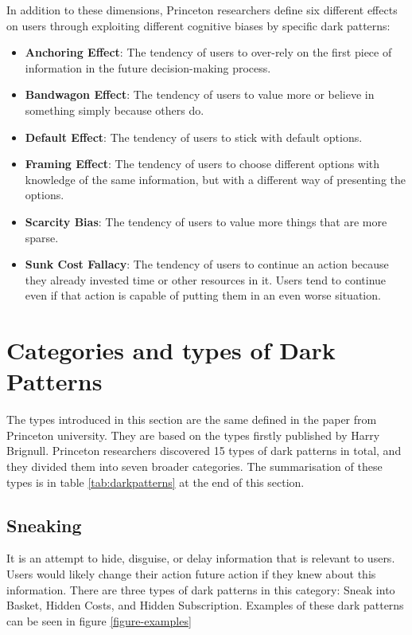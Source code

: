 In addition to these dimensions, Princeton researchers define six different effects on users through exploiting different cognitive biases by specific dark patterns:

\begin{itemize}
    \item \textbf{Anchoring Effect}: The tendency of users to over-rely on the first piece of information in the future decision-making process.
    \item \textbf{Bandwagon Effect}: The tendency of users to value more or believe in something simply because others do.
    \item \textbf{Default Effect}: The tendency of users to stick with default options.
    \item \textbf{Framing Effect}: The tendency of users to choose different options with knowledge of the same information, but with a different way of presenting the options.
    \item \textbf{Scarcity Bias}: The tendency of users to value more things that are more sparse.
    \item \textbf{Sunk Cost Fallacy}: The tendency of users to continue an action because they already invested time or other resources in it. Users tend to continue even if that action is capable of putting them in an even worse situation.
\end{itemize}

\section{Categories and types of Dark Patterns}
The types introduced in this section are the same defined in the paper from Princeton university\cite{dark-patterns-at-scale}. They are based on the types firstly published by Harry Brignull\cite{dark-patterns-brignull}.
Princeton researchers discovered 15 types of dark patterns in total, and they divided them into seven broader categories. The summarisation of these types is in table \ref{tab:darkpatterns} at the end of this section.
    \subsection{Sneaking}
    It is an attempt to hide, disguise, or delay information that is relevant to users. Users would likely change their action future action if they knew about this information. There are three types of dark patterns in this category: Sneak into Basket, Hidden Costs, and Hidden Subscription. Examples of these dark patterns can be seen in figure \ref{figure-examples}
